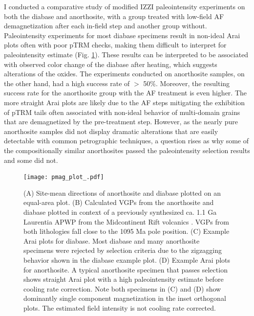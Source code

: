 \documentclass[draft]{agujournal2019}
\begin{document}
I conducted a comparative study of modified IZZI paleointensity experiments on both the diabase and anorthosite, with a group treated with low-field AF demagnetization after each in-field step and another group without. Paleointensity experiments for most diabase specimens result in non-ideal Arai plots often with poor pTRM checks, making them difficult to interpret for paleointensity estimate (Fig. \ref{fig:pmag}). These results can be interpreted to be associated with observed color change of the diabase after heating, which suggests alterations of the oxides. The experiments conducted on anorthosite samples, on the other hand, had a high success rate of $>$ 50\%. Moreover, the resulting success rate for the anorthosite group with the AF treatment is even higher. The more straight Arai plots are likely due to the AF steps mitigating the exhibition of pTRM tails often associated with non-ideal behavior of multi-domain grains that are demagnetized by the pre-treatment step. However, as the nearly pure anorthosite samples did not display dramatic alterations that are easily detectable with common petrographic techniques, a question rises as why some of the compositionally similar anorthosites passed the paleointensity selection results and some did not. 

\begin{figure}
\noindent\texttt{[image: pmag\_plot\_.pdf]}
\caption{\small{(A) Site-mean directions of anorthosite and diabase plotted on an equal-area plot. (B) Calculated VGPs from the anorthosite and diabase plotted in context of a previously synthesized ca. 1.1 Ga Laurentia APWP from the Midcontinent Rift volcanics \citep{Swanson-Hysell2019a}. VGPs from both lithologies fall close to the 1095 Ma pole position. (C) Example Arai plots for diabase. Most diabase and many anorthosite specimens were rejected by selection criteria due to the zigzagging behavior shown in the diabase example plot. (D) Example Arai plots for anorthosite. A typical anorthosite specimen that passes selection shows straight Arai plot with a high paleointensity estimate before cooling rate correction. Note both specimens in (C) and (D) show dominantly single component magnetization in the inset orthogonal plots. The estimated field intensity is not cooling rate corrected.}}
\label{fig:pmag}
\end{figure}
\end{document}
